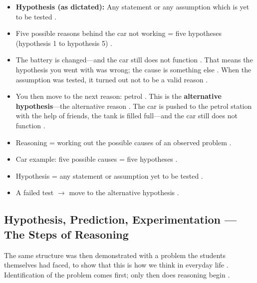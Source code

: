 \begin{KeyConcept}
\begin{itemize}
    \item \textbf{Hypothesis (as dictated):} Any statement or any assumption which is yet to be tested .
    \item Five possible reasons behind the car not working = five hypotheses (hypothesis 1 to hypothesis 5) .
    \item The battery is changed---and the car still does not function . That means the hypothesis you went with was wrong; the cause is something else . When the assumption was tested, it turned out not to be a valid reason .
    \item You then move to the next reason: petrol . This is the \textbf{alternative hypothesis}---the alternative reason . The car is pushed to the petrol station with the help of friends, the tank is filled full---and the car still does not function .
\end{itemize}
\end{KeyConcept}

\begin{QuickRevision}
\begin{itemize}
    \item Reasoning = working out the possible causes of an observed problem .
    \item Car example: five possible causes = five hypotheses .
    \item Hypothesis = any statement or assumption yet to be tested .
    \item A failed test $\rightarrow$ move to the alternative hypothesis .
\end{itemize}
\end{QuickRevision}

\subsection{Hypothesis, Prediction, Experimentation --- The Steps of Reasoning}
The same structure was then demonstrated with a problem the students themselves had faced, to show that this is how we think in everyday life . Identification of the problem comes first; only then does reasoning begin .

